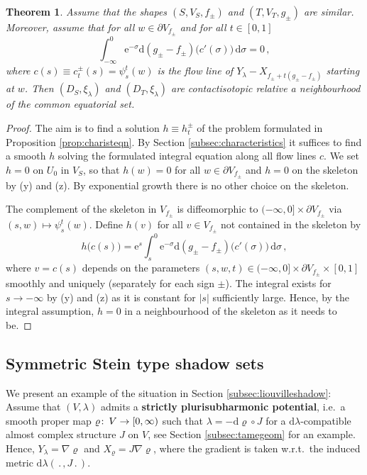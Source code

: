 \documentclass{amsart}
\newtheorem{thm}[prop]{Theorem}
\theoremstyle{definition}
\def\co{\colon\thinspace}
\newcommand{\rmd}{\mathrm d}
\newcommand{\rme}{\mathrm e}
\newcommand{\ra}{\rightarrow}
\begin{document}
\begin{thm}
\label{thm:similar}
  Assume that the shapes
  $(S,V_S,f_{\pm})$ and $(T,V_T,g_{\pm})$
  are similar.
  Moreover, assume that 
  for all $w\in\partial V_{f_{\pm}}\!$
  and for all $t\in[0,1]$
  \[
        \int_{-\infty}^0
          \rme^{-\sigma}
          \rmd(g_{\pm}-f_{\pm})
          \big(c'(\sigma)\big)\,
        \rmd\sigma
        =0
    \,,
  \]
  where $c(s)\equiv c_t^{\pm}(s)=\psi_s^t(w)$
  is the flow line of
  $Y_{\lambda}-X_{f_{\pm}+t(g_{\pm}-f_{\pm})}$
  starting at $w$.
  Then $(D_S,\xi_{\lambda})$ and $(D_T,\xi_{\lambda})$
  are contactisotopic relative a neighbourhood
  of the common equatorial set.
\end{thm}


\begin{proof}
  The aim is to find a solution $h\equiv h_t^{\pm}$
  of the problem formulated in
  Proposition \ref{prop:charisteqn}.
  By Section \ref{subsec:characteristics}
  it suffices to find a smooth $h$
  solving the formulated integral equation
  along all flow lines $c$.
  We set $h=0$ on $U_0$ in $V_S$,
  so that $h(w)=0$ for all $w\in\partial V_{f_{\pm}}\!$
  and $h=0$ on the skeleton by (y) and (z).
  By exponential growth
  there is no other choice on the skeleton.

  The complement of the skeleton in $V_{f_{\pm}}\!$
  is diffeomorphic to $(-\infty,0]\times\partial V_{f_{\pm}}\!$
  via $(s,w)\mapsto\psi_s^t(w)$.
  Define $h(v)$ for all $v\in V_{f_{\pm}}\!$
  not contained in the skeleton by
  \[
    h\big(c(s)\big)=
    \rme^s
        \int_s^0
          \rme^{-\sigma}
          \rmd(g_{\pm}-f_{\pm})
          \big(c'(\sigma)\big)\,
        \rmd\sigma
    \,,
  \]
  where $v=c(s)$ depends on the parameters
  $(s,w,t)\in(-\infty,0]\times\partial V_{f_{\pm}}\!\times[0,1]$
  smoothly and uniquely (separately for each sign $\pm$).
  The integral exists for $s\ra-\infty$ by (y) and (z)
  as it is constant for $|s|$ sufficiently large.
  Hence,
  by the integral assumption,
  $h=0$ in a neighbourhood of the skeleton
  as it needs to be.
\end{proof}




\subsection{Symmetric Stein type shadow sets}
\label{subsec:symmsteinshadow}


We present an example of the situation in
Section \ref{subsec:liouvilleshadow}:
  Assume that $(V,\lambda)$ admits a
  {\bf strictly plurisubharmonic potential},
  i.e.\ a smooth proper map $\varrho\co V\ra[0,\infty)$
  such that $\lambda=-\rmd\varrho\circ J$
  for a $\rmd\lambda$-compatible
  almost complex structure $J$ on $V$,
  see Section \ref{subsec:tamegeom} for an example.
  Hence,
  $Y_{\lambda}=\nabla\!\varrho$
  and $X_{\varrho}=J\nabla\!\varrho$,
  where the gradient is taken w.r.t.\
  the induced metric $\rmd\lambda(\,.\,,J\,.\,)$.
  
\end{document}
